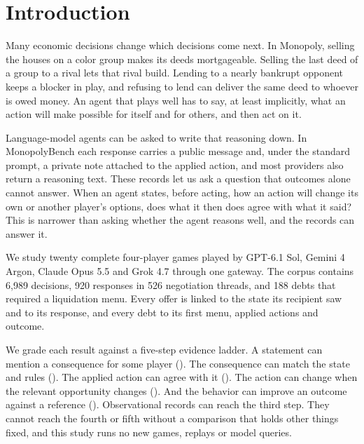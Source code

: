 \section{Introduction}
\label{sec:intro}

Many economic decisions change which decisions come next. In Monopoly, selling the houses on a color group makes its deeds mortgageable. Selling the last deed of a group to a rival lets that rival build. Lending to a nearly bankrupt opponent keeps a blocker in play, and refusing to lend can deliver the same deed to whoever is owed money. An agent that plays well has to say, at least implicitly, what an action will make possible for itself and for others, and then act on it.

Language-model agents can be asked to write that reasoning down. In MonopolyBench each response carries a public message and, under the standard prompt, a private note attached to the applied action, and most providers also return a reasoning text. These records let us ask a question that outcomes alone cannot answer. When an agent states, before acting, how an action will change its own or another player's options, does what it then does agree with what it said? This is narrower than asking whether the agent reasons well, and the records can answer it.

We study twenty complete four-player games played by GPT-6.1 Sol, Gemini 4 Argon, Claude Opus 5.5 and Grok 4.7 through one gateway. The corpus contains 6,989 decisions, 920 responses in 526 negotiation threads, and 188 debts that required a liquidation menu. Every offer is linked to the state its recipient saw and to its response, and every debt to its first menu, applied actions and outcome.

We grade each result against a five-step evidence ladder. A statement can mention a consequence for some player (). The consequence can match the state and rules (). The applied action can agree with it (). The action can change when the relevant opportunity changes (). And the behavior can improve an outcome against a reference (). Observational records can reach the third step. They cannot reach the fourth or fifth without a comparison that holds other things fixed, and this study runs no new games, replays or model queries.

